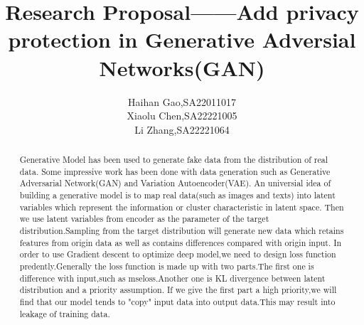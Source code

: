 \documentclass[
    ngerman,american
    ]{scrartcl}
\title{
        Research Proposal——Add privacy protection in Generative Adversial Networks(GAN)
        \\  \Large{\paperSubTitle{\lang}}} %
\author{
        Haihan Gao,SA22011017\\
        Xiaolu Chen,SA22221005\\
        Li Zhang,SA22221064
        }
\newcommand{\lang}{en}
\begin{document}
    
      \maketitle
        \begin{abstract}

            \ifthenelse{\equal{en}{\lang}}{}{}
            Generative Model has been used to generate fake data from the distribution of real data.
            Some impressive work has been done with data generation such as Generative Adversarial Network(GAN) and Variation Autoencoder(VAE).
            An universial idea of building a generative model is to map real data(such as images and texts) into latent variables which represent the information or cluster characteristic in latent space.
            Then we use latent variables from encoder as the parameter of the target distribution.Sampling from the target distribution will generate new data which retains features from origin data as well as contains differences compared with origin input. 
            In order to use Gradient descent to optimize deep model,we need to design loss function predently.Generally the loss function is made up with two parts.The first one is difference with input,such as mseloss.Another one is KL divergence between latent distribution and a priority assumption.
            If we give the first part a high priority,we will find that our model tends to "copy" input data into output data.This may result into leakage of training data.

        \end{abstract}
        
\end{document}
